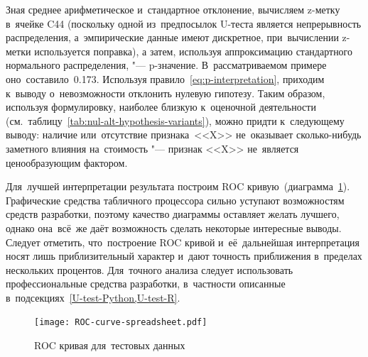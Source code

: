 \documentclass[]{scrreprt}
\begin{document}
Зная среднее арифметическое и~стандартное отклонение, вычисляем z-метку в~ячейке C44 (поскольку одной из~предпосылок U-теста является непрерывность распределения, а~эмпирические данные имеют дискретное, при~вычислении z-метки используется поправка), а затем, используя аппроксимацию стандартного нормального распределения, "--- p-значение. В~рассматриваемом примере оно~составило~0.173. Используя правило~\ref{eq:p-interpretation}, приходим к~выводу о~невозможности отклонить нулевую гипотезу. Таким образом, используя формулировку, наиболее близкую к~оценочной деятельности (см.~таблицу~\ref{tab:nul-alt-hypothesis-variants}), можно придти к~следующему выводу: наличие или~отсутствие признака~<<X>> не~оказывает сколько-нибудь заметного влияния на~стоимость "--- признак <<X>> не~является ценообразующим фактором.

Для~лучшей интерпретации результата построим ROC кривую~(диаграмма~\ref{fig:ROC-curve-spreadsheet}). Графические средства табличного процессора сильно уступают возможностям средств разработки, поэтому качество диаграммы оставляет желать лучшего, однако она~всё~же даёт возможность сделать некоторые интересные выводы. Следует отметить, что~построение ROC кривой и~её~дальнейшая интерпретация носят лишь приблизительный характер и~дают точность приближения в~пределах нескольких процентов. Для~точного анализа следует использовать профессиональные средства разработки, в~частности описанные в~подсекциях~\cref{U-test-Python,U-test-R}.
%
\begin{figure}[ht]
	\centering
	\texttt{[image: ROC-curve-spreadsheet.pdf]}
	\caption{ROC кривая для~тестовых данных}
	\label{fig:ROC-curve-spreadsheet}
\end{figure}
% 
\end{document}
